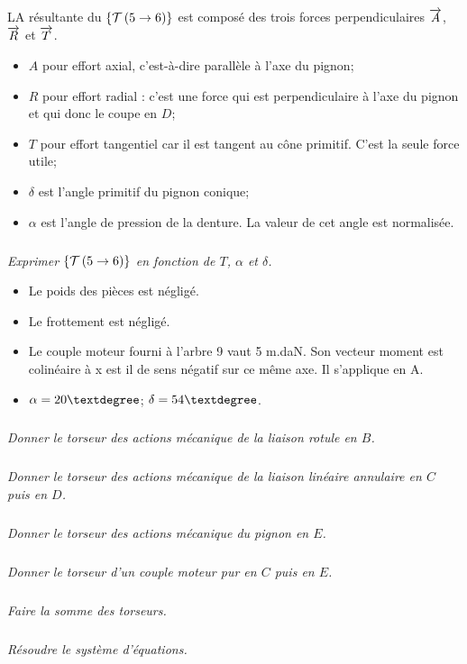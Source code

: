\documentclass[10pt]{article}
\begin{document}
LA résultante du  $\left\{\mathcal{T} \left(5\rightarrow 6 \right) \right\}$ est composé des trois forces perpendiculaires $\overrightarrow{A}$, $\overrightarrow{R}$ et $\overrightarrow{T}$. 

\begin{rem}
\begin{itemize}
\item $A$ pour effort axial, c'est-à-dire parallèle à l'axe du pignon;
\item $R$ pour effort radial : c'est une force qui est perpendiculaire à l'axe du pignon et qui donc le coupe en $D$;
\item $T$ pour effort tangentiel car il est tangent au cône primitif. C'est la seule force utile;
\item $\delta$ est l'angle primitif du pignon conique;
\item $\alpha$ est l'angle de pression de la denture. La valeur de cet angle est normalisée.
\end{itemize}
\end{rem}

\subparagraph{}
\textit{Exprimer  $\left\{\mathcal{T} \left(5\rightarrow 6 \right) \right\}$ en fonction de $T$, $\alpha$ et $\delta$. }

\begin{hypo}
\begin{itemize}
\item Le poids des pièces est négligé.
\item Le frottement est négligé.
\item Le couple moteur fourni à l'arbre 9 vaut 5 m.daN. Son vecteur moment est colinéaire à x est il de sens négatif sur ce même axe. Il s'applique en A.
\item $\alpha = 20\textdegree$; $\delta = 54\textdegree$.
\end{itemize}
\end{hypo}

\subparagraph{}
\textit{Donner le torseur des actions mécanique de la liaison rotule en $B$.}

\subparagraph{}
\textit{Donner le torseur des actions mécanique de la liaison linéaire annulaire en $C$ puis en $D$. }


\subparagraph{}
\textit{Donner le torseur des actions mécanique du pignon en $E$. }

\subparagraph{}
\textit{Donner le torseur d'un couple moteur pur en $C$ puis en $E$.}

\subparagraph{}
\textit{Faire la somme des torseurs.}


\subparagraph{}
\textit{Résoudre le système d'équations.}
\end{document}
